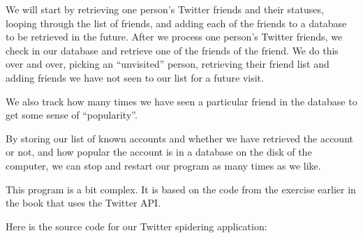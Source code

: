 \documentclass[11pt]{book}
\begin{document}
We will start by retrieving one person's Twitter friends and their
statuses, looping through the list of friends, and adding each 
of the friends to a database to be retrieved in the future.  After
we process one person's Twitter friends, we check in our database
and retrieve one of the friends of the friend.  We do this over and
over, picking an ``unvisited'' person, retrieving their friend list
and adding friends we have not seen to our list for a future visit.

We also track how many times we have seen a particular friend in the
database to get some sense of ``popularity''.

By storing our list of known accounts and whether 
we have retrieved the account or not, 
and how popular the account is in a database on the disk
of the computer, we can stop and
restart our program as many times as we like.

This program is a bit complex. It is based on the code 
from the exercise earlier in the book that uses
the Twitter API.

Here is the source code for our Twitter spidering application:
\end{document}
